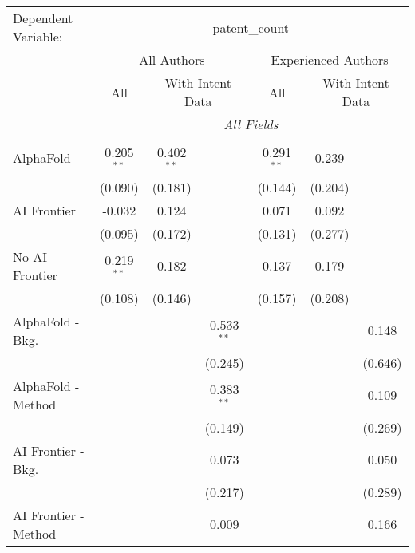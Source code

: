 \begingroup
\centering
\begin{tabular}{lcccccc}
   \tabularnewline \midrule \midrule
   Dependent Variable: & \multicolumn{6}{c}{patent\_count}\\
 & \multicolumn{3}{c}{All Authors} & \multicolumn{3}{c}{Experienced Authors} \\
\cmidrule(lr){2-4} \cmidrule(lr){5-7}
 & \multicolumn{1}{c}{All} & \multicolumn{2}{c}{With Intent Data} & \multicolumn{1}{c}{All} & \multicolumn{2}{c}{With Intent Data} \\
\cmidrule(lr){2-2} \cmidrule(lr){3-4} \cmidrule(lr){5-5} \cmidrule(lr){6-7}
 & \multicolumn{6}{c}{\textit{All Fields}} \\ \\
   AlphaFold               & 0.205$^{**}$ & 0.402$^{**}$ &              & 0.291$^{**}$ & 0.239   &   \\   
                           & (0.090)      & (0.181)      &              & (0.144)      & (0.204) &   \\   
   AI Frontier             & -0.032       & 0.124        &              & 0.071        & 0.092   &   \\   
                           & (0.095)      & (0.172)      &              & (0.131)      & (0.277) &   \\   
   No AI Frontier          & 0.219$^{**}$ & 0.182        &              & 0.137        & 0.179   &   \\   
                           & (0.108)      & (0.146)      &              & (0.157)      & (0.208) &   \\   
   AlphaFold - Bkg.        &              &              & 0.533$^{**}$ &              &         & 0.148\\   
                           &              &              & (0.245)      &              &         & (0.646)\\   
   AlphaFold - Method      &              &              & 0.383$^{**}$ &              &         & 0.109\\   
                           &              &              & (0.149)      &              &         & (0.269)\\   
   AI Frontier - Bkg.      &              &              & 0.073        &              &         & 0.050\\   
                           &              &              & (0.217)      &              &         & (0.289)\\   
   AI Frontier - Method    &              &              & 0.009        &              &         & 0.166\\   

\end{tabular}
